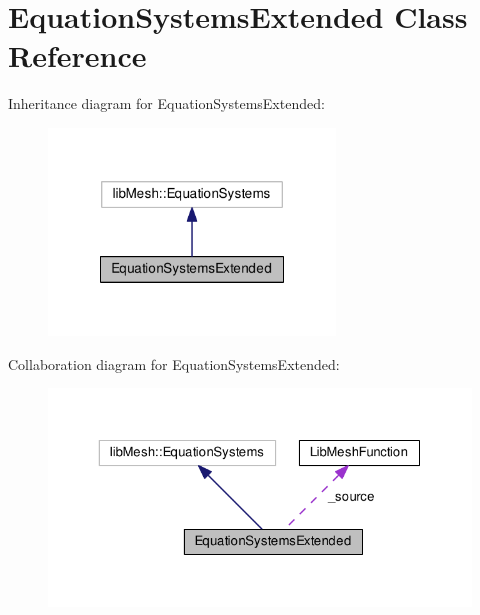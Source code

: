 \hypertarget{class_equation_systems_extended}{\section{Equation\-Systems\-Extended Class Reference}
\label{class_equation_systems_extended}
}


Inheritance diagram for Equation\-Systems\-Extended\-:\nopagebreak
\begin{figure}[H]
\begin{center}
\leavevmode
\includegraphics[width=216pt]{class_equation_systems_extended__inherit__graph}
\end{center}
\end{figure}


Collaboration diagram for Equation\-Systems\-Extended\-:\nopagebreak
\begin{figure}[H]
\begin{center}
\leavevmode
\includegraphics[width=325pt]{class_equation_systems_extended__coll__graph}
\end{center}
\end{figure}
